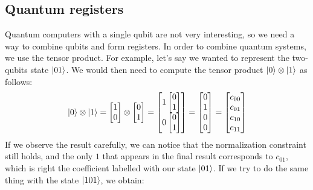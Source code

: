 \documentclass[12pt,a4paper]{report}
\theoremstyle{definition}
\theoremstyle{definition}
\theoremstyle{definition}
\begin{document}
\subsection{Quantum registers}
Quantum computers with a single qubit are not very interesting, so we need a way to combine qubits and form registers. In order to combine quantum systems, we use the tensor product.
For example, let's say we wanted to represent the two-qubits state $\ket{01}$. We would then need to compute the tensor product $\ket{0}\otimes\ket{1}$ as follows:
\begin{equation*}
    \ket{0}\otimes\ket{1}=\begin{bmatrix}
        1\\
        0
    \end{bmatrix}\otimes\begin{bmatrix}
        0\\
        1
    \end{bmatrix}=\begin{bmatrix}
        1\begin{bmatrix}
            0\\
            1
        \end{bmatrix}\\
        0\begin{bmatrix}
            0\\
            1
        \end{bmatrix}
    \end{bmatrix}=\begin{bmatrix}
            0\\
            1\\
            0\\
            0
    \end{bmatrix}=\begin{bmatrix}
            c_{00}\\
            c_{01}\\
            c_{10}\\
            c_{11}
    \end{bmatrix}
\end{equation*}
If we observe the result carefully, we can notice that the normalization constraint still holds, and the only $1$ that appears in the final result corresponds to $c_{01}$, which is right the coefficient labelled with our state $\ket{01}$. If we try to do the same thing with the state $\ket{101}$, we obtain:
\end{document}
